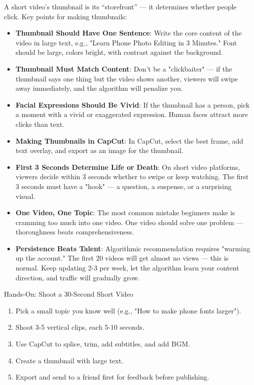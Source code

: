 
A short video's thumbnail is its “storefront” — it determines whether people click. Key points for making thumbnails:

\begin{itemize}
  \item \textbf{Thumbnail Should Have One Sentence}: Write the core content of the video in large text, e.g., "Learn Phone Photo Editing in 3 Minutes." Font should be large, colors bright, with contrast against the background.
  \item \textbf{Thumbnail Must Match Content}: Don't be a "clickbaiter" — if the thumbnail says one thing but the video shows another, viewers will swipe away immediately, and the algorithm will penalize you.
  \item \textbf{Facial Expressions Should Be Vivid}: If the thumbnail has a person, pick a moment with a vivid or exaggerated expression. Human faces attract more clicks than text.
  \item \textbf{Making Thumbnails in CapCut}: In CapCut, select the best frame, add text overlay, and export as an image for the thumbnail.
\end{itemize}


\begin{itemize}
  \item \textbf{First 3 Seconds Determine Life or Death}: On short video platforms, viewers decide within 3 seconds whether to swipe or keep watching. The first 3 seconds must have a "hook" — a question, a suspense, or a surprising visual.
  \item \textbf{One Video, One Topic}: The most common mistake beginners make is cramming too much into one video. One video should solve one problem — thoroughness beats comprehensiveness.
  \item \textbf{Persistence Beats Talent}: Algorithmic recommendation requires "warming up the account." The first 20 videos will get almost no views — this is normal. Keep updating 2-3 per week, let the algorithm learn your content direction, and traffic will gradually grow.
\end{itemize}

\begin{tcbpractice}{Hands-On: Shoot a 30-Second Short Video}
\begin{enumerate}
  \item Pick a small topic you know well (e.g., "How to make phone fonts larger").
  \item Shoot 3-5 vertical clips, each 5-10 seconds.
  \item Use CapCut to splice, trim, add subtitles, and add BGM.
  \item Create a thumbnail with large text.
  \item Export and send to a friend first for feedback before publishing.
\end{enumerate}

\end{tcbpractice}

